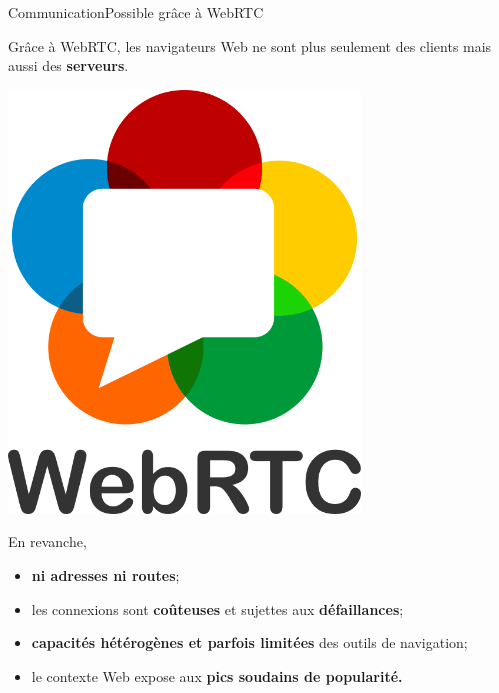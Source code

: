 \begin{frame}{Communication}{Possible grâce à WebRTC}


  \begin{minipage}{0.67\textwidth}
    Grâce à WebRTC, les navigateurs Web ne sont plus seulement des clients mais
    aussi des \textbf{serveurs}.
  \end{minipage}
  \hfill
  \begin{minipage}{0.3\textwidth}
    \begin{center}
    \includegraphics[width=0.7\textwidth]{img/webrtc.png}
    \end{center}
  \end{minipage}
  
  En revanche, 
  \begin{itemize}
  \item \textbf{ni adresses ni routes};
  \item les connexions sont \textbf{coûteuses} et sujettes aux
    \textbf{défaillances};
  \item \textbf{capacités hétérogènes et parfois limitées} des outils de
    navigation;
  \item le contexte Web expose aux \textbf{pics soudains de popularité.}
  \end{itemize}
  
\end{frame}


